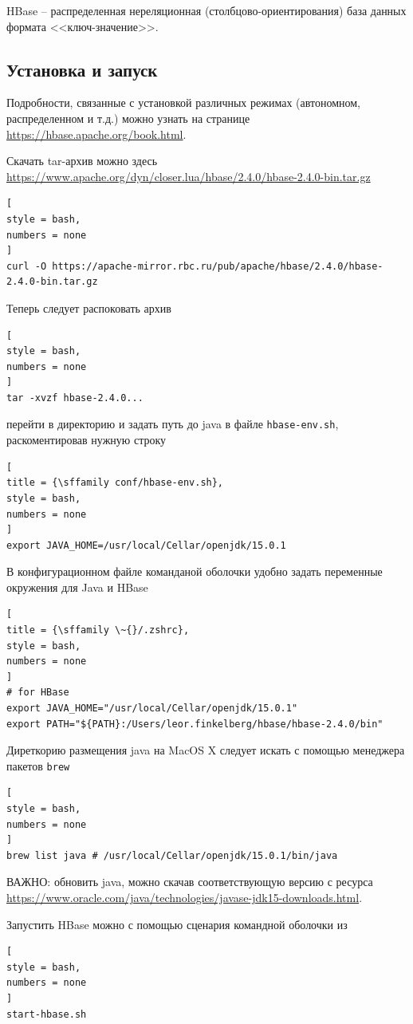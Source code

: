 \documentclass[%
	11pt,
	a4paper,
	utf8,
		]{article}
\begin{document}
HBase -- распределенная нереляционная (столбцово-ориентирования) база данных формата <<ключ-значение>>. 

\subsection{Установка и запуск}

Подробности, связанные с установкой различных режимах (автономном, распределенном и т.д.) можно узнать на странице \url{https://hbase.apache.org/book.html}.

Скачать tar-архив можно здесь \url{https://www.apache.org/dyn/closer.lua/hbase/2.4.0/hbase-2.4.0-bin.tar.gz}
\begin{lstlisting}[
style = bash,
numbers = none	
]
curl -O https://apache-mirror.rbc.ru/pub/apache/hbase/2.4.0/hbase-2.4.0-bin.tar.gz
\end{lstlisting}

Теперь следует распоковать архив
\begin{lstlisting}[
style = bash,
numbers = none	
]
tar -xvzf hbase-2.4.0...
\end{lstlisting}
перейти в директорию  и задать путь до java в файле \texttt{hbase-env.sh}, раскоментировав нужную строку
\begin{lstlisting}[
title = {\sffamily conf/hbase-env.sh},
style = bash,
numbers = none	
]
export JAVA_HOME=/usr/local/Cellar/openjdk/15.0.1
\end{lstlisting}

В конфигурационном файле команданой оболочки удобно задать переменные окружения для Java и HBase
\begin{lstlisting}[
title = {\sffamily \~{}/.zshrc},
style = bash,
numbers = none	
]
# for HBase
export JAVA_HOME="/usr/local/Cellar/openjdk/15.0.1"
export PATH="${PATH}:/Users/leor.finkelberg/hbase/hbase-2.4.0/bin"
\end{lstlisting}

Диреткорию размещения java на MacOS X следует искать с помощью менеджера пакетов \texttt{brew}
\begin{lstlisting}[
style = bash,
numbers = none
]
brew list java # /usr/local/Cellar/openjdk/15.0.1/bin/java
\end{lstlisting}

ВАЖНО: обновить java, можно скачав соответствующую версию с ресурса \url{https://www.oracle.com/java/technologies/javase-jdk15-downloads.html}.

Запустить HBase можно с помощью сценария командной оболочки из 
\begin{lstlisting}[
style = bash,
numbers = none	
]
start-hbase.sh
\end{lstlisting}
\end{document}
